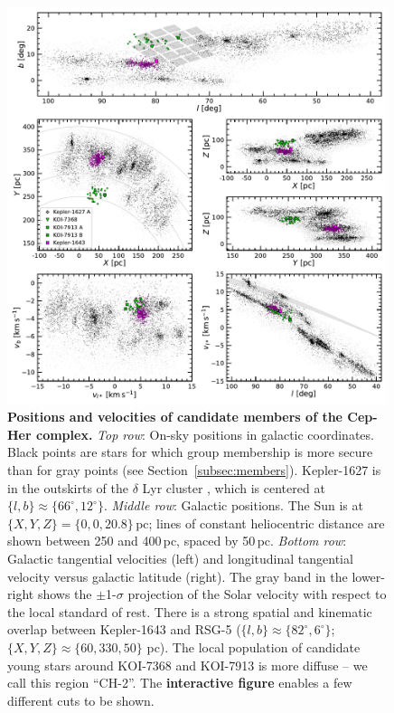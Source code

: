 \documentclass[12pt,twocolumn,linenumbers]{aastex63}
\begin{document}
\begin{figure}[t]
	\begin{center}
		\leavevmode
		\includegraphics[width=0.99\textwidth]{f1.pdf}
	\end{center}
	\vspace{-0.7cm}
	\caption{
  {\bf Positions and velocities of candidate members of the Cep-Her
  complex.}
  {\it Top row}: On-sky positions in galactic coordinates.  Black
  points are stars for which group membership is more secure than for
  gray points (see Section~\ref{subsec:members}).
  Kepler-1627 is in the outskirts of the $\delta$ Lyr cluster
  \citep{bouma_kep1627_2022}, which is centered at $\{ l, b\} \approx
  \{ 66^\circ, 12^\circ\}$.
  {\it Middle row}: Galactic positions.  The Sun is at $\{X, Y, Z\} =
  \{0, 0, 20.8\}$\,pc; lines of constant heliocentric distance are
  shown between 250 and 400\,pc, spaced by 50\,pc.
  {\it Bottom row}: Galactic tangential velocities (left) and
  longitudinal tangential velocity versus galactic latitude (right).
  The gray band in the lower-right shows the $\pm$1-$\sigma$
  projection of the Solar velocity with respect to the local standard
  of rest.  There is a strong spatial and kinematic overlap between
  Kepler-1643 and RSG-5 ($\{ l, b\} \approx \{ 82^\circ, 6^\circ\}$;
  $\{ X, Y, Z\} \approx \{60, 330, 50\} $ pc).  The local population
  of candidate young stars around KOI-7368 and KOI-7913 is more
  diffuse -- we call this region ``CH-2''.
  The {\bf interactive figure} enables a few different cuts to be
  shown.
	\label{fig:XYZvtang}
	}
\end{figure}
\end{document}

